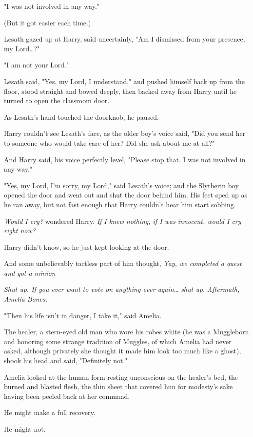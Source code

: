"I was not involved in any way."

(But it got easier each time.)

Lesath gazed up at Harry, said uncertainly, "Am I dismissed from your presence, 
my Lord{\ldots}?"

"I am not your Lord."

Lesath said, "Yes, my Lord, I understand," and pushed himself back up from the 
floor, stood straight and bowed deeply, then backed away from Harry until he 
turned to open the classroom door.

As Lesath's hand touched the doorknob, he paused.

Harry couldn't see Lesath's face, as the older boy's voice said, "Did you send 
her to someone who would take care of her? Did she ask about me at all?"

And Harry said, his voice perfectly level, "Please stop that. I was not 
involved in any way."

"Yes, my Lord, I'm sorry, my Lord," said Lesath's voice; and the Slytherin boy 
opened the door and went out and shut the door behind him. His feet sped up as 
he ran away, but not fast enough that Harry couldn't hear him start sobbing.

\emph{Would I cry?} wondered Harry. \emph{If I knew nothing, if I was innocent, 
would I cry right now?}

Harry didn't know, so he just kept looking at the door.

And some unbelievably tactless part of him thought, \emph{Yay, we completed a 
quest and got a minion---}

\emph{Shut up. If you ever want to vote on anything ever again{\ldots} shut up.}
\sbreak
\emph{Aftermath, Amelia Bones:}

"Then his life isn't in danger, I take it," said Amelia.

The healer, a stern-eyed old man who wore his robes white (he was a Muggleborn 
and honoring some strange tradition of Muggles, of which Amelia had never 
asked, although privately she thought it made him look too much like a ghost), 
shook his head and said, "Definitely not."

Amelia looked at the human form resting unconscious on the healer's bed, the 
burned and blasted flesh, the thin sheet that covered him for modesty's sake 
having been peeled back at her command.

He might make a full recovery.

He might not.

